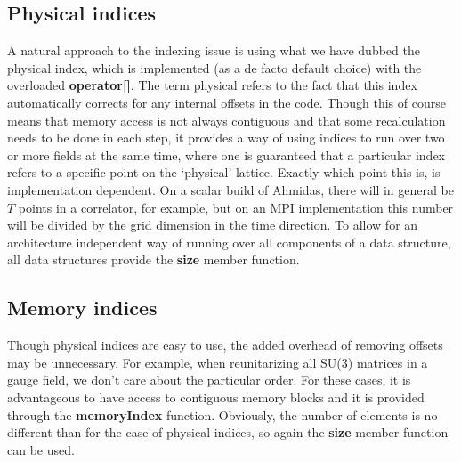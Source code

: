\documentclass[a4paper,12pt,twoside]{article}
\begin{document}
\subsection{Physical indices}
A natural approach to the indexing issue is using what we have dubbed the physical index, which is implemented (as a de facto default choice) with the overloaded \textbf{operator[]}. The term physical refers to the fact that this index automatically corrects for any internal offsets in the code. Though this of course means that memory access is not always contiguous and that some recalculation needs to be done in each step, it provides a way of using indices to run over two or more fields at the same time, where one is guaranteed that a particular index refers to a specific point on the `physical' lattice. Exactly which point this is, is implementation dependent. On a scalar build of Ahmidas, there will in general be $T$ points in a correlator, for example, but on an MPI implementation this number will be divided by the grid dimension in the time direction. To allow for an architecture independent way of running over all components of a data structure, all data structures provide the \textbf{size} member function.

\subsection{Memory indices}
Though physical indices are easy to use, the added overhead of removing offsets may be unnecessary. For example, when reunitarizing all SU(3) matrices in a gauge field, we don't care about the particular order. For these cases, it is advantageous to have access to contiguous memory blocks and it is provided through the \textbf{memoryIndex} function. Obviously, the number of elements is no different than for the case of physical indices, so again the \textbf{size} member function can be used.
\end{document}

